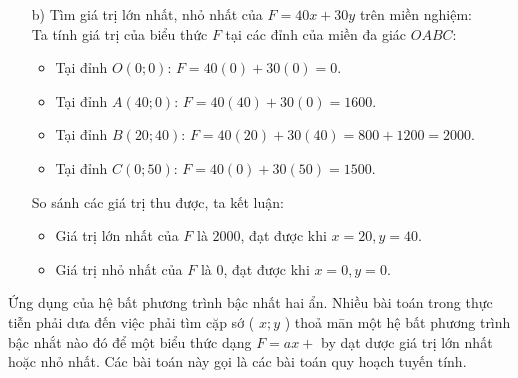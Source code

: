 \begin{vd}
{\begin{enumerate}
\begin{center}
			\end{center}
			
			Giao của các nửa mặt phẳng trên chính là miền nghiệm của hệ bất phương trình. Đó là miền đa giác $OABC$ (kể cả biên) với tọa độ các đỉnh: $O(0;0)$, $A(40;0)$, $B(20;40)$ và $C(0;50)$.
			
			\item[b)] Tìm giá trị lớn nhất, nhỏ nhất của $F = 40x + 30y$ trên miền nghiệm:\\
			Ta tính giá trị của biểu thức $F$ tại các đỉnh của miền đa giác $OABC$:
			\begin{itemize}
				\item Tại đỉnh $O(0;0)$: $F = 40(0) + 30(0) = 0$.
				\item Tại đỉnh $A(40;0)$: $F = 40(40) + 30(0) = 1600$.
				\item Tại đỉnh $B(20;40)$: $F = 40(20) + 30(40) = 800 + 1200 = 2000$.
				\item Tại đỉnh $C(0;50)$: $F = 40(0) + 30(50) = 1500$.
			\end{itemize}
			So sánh các giá trị thu được, ta kết luận:
			\begin{itemize}
				\item Giá trị lớn nhất của $F$ là $2000$, đạt được khi $x = 20, y = 40$.
				\item Giá trị nhỏ nhất của $F$ là $0$, đạt được khi $x = 0, y = 0$.
			\end{itemize}
		\end{enumerate}
	}
\end{vd}
\begin{dang}{Ứng dụng của hệ bất phương trình bậc nhất hai ẩn.}
	Nhiều bài toán trong thực tiễn phải dưa đến việc phải tìm cặp sớ ( $x ; y$ ) thoả mān một hệ bất phương trình bậc nhắt nào đó để một biểu thức dạng $F=a x+$ by dạt dược giá trị lớn nhất hoặc nhỏ nhất. Các bài toán này gọi là các bài toán quy hoạch tuyến tính.
\end{dang}

